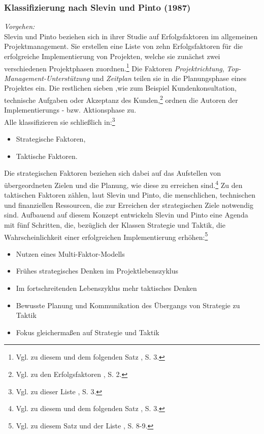 \noindent
\subsubsection{Klassifizierung nach Slevin und Pinto (1987)}
\textit{Vorgehen:}\\\noindent
Slevin und Pinto beziehen sich in ihrer Studie auf Erfolgsfaktoren im allgemeinen Projektmanagement.
Sie erstellen eine Liste von zehn Erfolgsfaktoren für die erfolgreiche Implementierung
von Projekten, welche sie zunächst zwei verschiedenen Projektphasen zuordnen.\footnote{Vgl. zu diesem und dem folgenden Satz \cite{Slevin.1987}, S. 3.} 
Die Faktoren \textit{Projektrichtung}, \textit{Top-Management-Unterstützung} und \textit{Zeitplan} teilen sie in die Planungsphase eines Projektes ein. 
Die restlichen sieben \EF,wie zum Beispiel Kundenkonsultation, technische Aufgaben oder Akzeptanz des 
Kunden,\footnote{Vgl. zu den Erfolgsfaktoren \cite{Slevin.1987}, S. 2.} ordnen die Autoren der Implementierungs - 
bzw. Aktionsphase zu.\\\noindent
Alle \EF klassifizieren sie schließlich in:\footnote{Vgl. zu dieser Liste \cite{Slevin.1987}, S. 3.}
\begin{itemize}\itemsep0pt
\item[-]Strategische Faktoren,
\item[-]Taktische Faktoren.
\end{itemize}
Die strategischen Faktoren beziehen sich dabei auf das Aufstellen von übergeordneten Zielen und die Planung, wie diese zu erreichen sind.\footnote{Vgl. zu diesem und dem folgenden Satz \cite{Slevin.1987}, S. 3.}
Zu den taktischen Faktoren zählen, laut Slevin und Pinto, die menschlichen, technischen und finanziellen Ressourcen, die zur Erreichen der
strategischen Ziele notwendig sind. Aufbauend auf diesem Konzept entwickeln Slevin und Pinto eine Agenda mit fünf Schritten, die, bezüglich
der Klassen Strategie und Taktik, die Wahrscheinlichkeit einer erfolgreichen Implementierung erhöhen:\footnote{Vgl. zu diesem Satz und der Liste \cite{Slevin.1987}, S. 8-9.}
\begin{itemize}\itemsep0pt
\item[1.]Nutzen eines Multi-Faktor-Modells
\item[2.]Frühes strategisches Denken im Projektlebenszyklus
\item[3.]Im fortschreitenden Lebenszyklus mehr taktisches Denken
\item[4.]Bewusste Planung und Kommunikation des Übergangs von Strategie zu Taktik
\item[5.]Fokus gleichermaßen auf Strategie und Taktik
\end{itemize}

